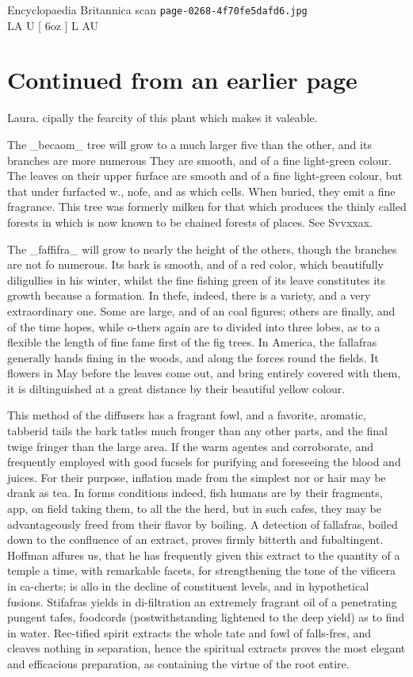 \documentclass{article}
\begin{document}
\begin{center}
{\Large Encyclopaedia Britannica scan \texttt{page-0268-4f70fe5dafd6.jpg}}\\[0.5em]
LA U [ 6oz ] L AU
\end{center}
\section*{Continued from an earlier page}
Laura. cipally the fearcity of this plant which makes it valeable.

The \_becaom\_ tree will grow to a much larger five than the other, and its branches are more numerous They are smooth, and of a fine light-green colour. The leaves on their upper furface are smooth and of a fine light-green colour, but that under furfacted w., nofe, and as which cells. When buried, they emit a fine fragrance. This tree was formerly milken for that which produces the thinly called forests in which is now known to be chained forests of places. See Svvxxax.

The \_faffifra\_ will grow to nearly the height of the others, though the branches are not fo numerous. Its bark is smooth, and of a red color, which beautifully diligullies in his winter, whilst the fine fishing green of its leave constitutes its growth because a formation. In thefe, indeed, there is a variety, and a very extraordinary one. Some are large, and of an coal figures; others are finally, and of the time hopes, while o-thers again are to divided into three lobes, as to a flexible the length of fine fame first of the fig trees. In America, the fallafras generally hands fining in the woods, and along the forces round the fields. It flowers in May before the leaves come out, and bring entirely covered with them, it is diltinguished at a great distance by their beautiful yellow colour.

This method of the diffusers has a fragrant fowl, and a favorite, aromatic, tabberid tails the bark tatles much fronger than any other parts, and the final twige fringer than the large area. If the warm agentes and corroborate, and frequently employed with good fucsels for purifying and foreseeing the blood and juices. For their purpose, inflation made from the simplest nor or hair may be drank as tea. In forms conditions indeed, fish humans are by their fragments, app, on field taking them, to all the the herd, but in such cafes, they may be advantageously freed from their flavor by boiling. A detection of fallafras, boiled down to the confluence of an extract, proves firmly bitterth and fubaltingent. Hoffman affures us, that he has frequently given this extract to the quantity of a temple a time, with remarkable facets, for strengthening the tone of the vificera in ca-cherts; is allo in the decline of constituent levels, and in hypothetical fusions. Stifafras yields in di-filtration an extremely fragrant oil of a penetrating pungent tafes, foodcords (postwithstanding lightened to the deep yield) as to find in water. Rec-tified spirit extracts the whole tate and fowl of falls-fres, and cleaves nothing in separation, hence the spiritual extracts proves the most elegant and efficacious preparation, as containing the virtue of the root entire.
\end{document}
